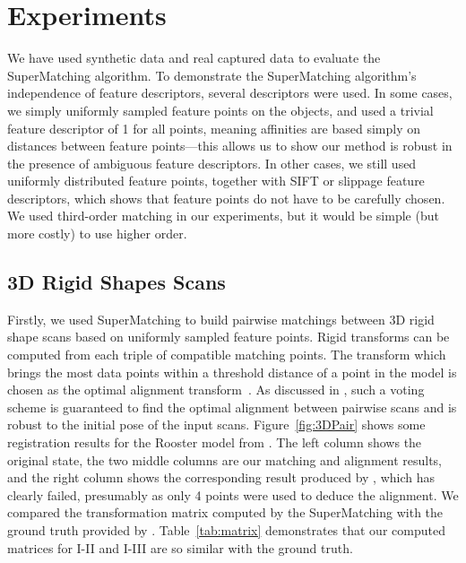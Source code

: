 \section{Experiments}
\label{sec:experiments}

We have used synthetic data and real captured data to evaluate the SuperMatching algorithm.
To demonstrate  the SuperMatching algorithm's independence of feature descriptors, several descriptors were used.
In some cases, we simply uniformly sampled feature points on the objects, and used a trivial feature descriptor of 1 for all points, meaning affinities are based simply on distances between feature points---this allows us to show our method is robust in the presence of ambiguous feature descriptors.
In other cases, we still used uniformly distributed feature points, together with SIFT or slippage feature descriptors, which shows that feature points do not have to be carefully chosen.
We used third-order matching in our experiments, but it would be simple (but more costly) to use higher order.

\subsection{3D Rigid Shapes Scans}
\label{subsec:3DRigid}

Firstly, we used SuperMatching to build pairwise matchings between 3D rigid shape scans based on uniformly sampled feature points.
Rigid transforms can be computed from each triple of compatible matching points.
The transform which brings the most data points within a threshold distance of a point in the model is chosen as the optimal alignment transform~\cite{Huttenlocher90}.
As discussed in \cite{Gelfand05}, such a voting scheme is guaranteed to find the optimal alignment between pairwise scans and is robust to the initial pose of the input scans.
Figure~\ref{fig:3DPair} shows some registration results for the Rooster model from \cite{Chuang09}. The left column shows the original state,
the two middle columns are our matching and alignment results, and
the right column shows the corresponding result produced by \cite{Aiger08}, which has clearly failed, presumably as only 4 points were used to deduce the alignment.
We compared the transformation matrix computed by the SuperMatching with the ground truth provided by \cite{Chuang09}.
Table~\ref{tab:matrix} demonstrates that our computed matrices for I-II and I-III are so similar with the ground truth. 

